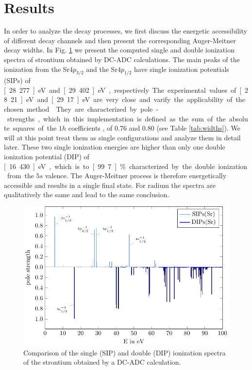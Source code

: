 \section{Results}
\label{section:results}

In order to analyze the decay processes, we first discuss the energetic
accessibility of different decay channels and then present the corresponding
Auger-Meitner decay widths.
In Fig. \ref{fig:sdip} we present the computed
single and double ionization spectra
of strontium obtained by DC-ADC calculations. The main peaks of the
ionization
from the Sr$4p_{3/2}$ and the Sr$4p_{1/2}$ have single ionization potentials (SIPs)
of \unit[28.277]{eV} and \unit[29.402]{eV}, respectively. The experimental
values of \unit[28.21]{eV} and \unit[29.17]{eV} are very close and
varify the applicability
of the chosen method \cite{Schmitz76}.
They are characterized by pole-strengths, which in this implementation
is defined as
the sum of the absolute squares of the $1h$ coefficients
\cite{Trofimov05}, of 0.76 and 0.80
(see Table \ref{tab:widths}). We will at this point treat them as single
configurations and analyze them in detail later.
These two single ionization energies are higher
than only one double ionization potential (DIP) of \unit[16.430]{eV},
which is to \unit[99.7]{\%} characterized by the double ionization from
the $5s$ valence. The Auger-Meitner process is therefore energetically accessible and
results in a single final state.
For radium the spectra are qualitatively the same and
lead to the same conclusion.

\begin{figure}[h]
 \centering
 \includegraphics[width=\columnwidth]{pics/Sr_rel_sdip.pdf}
 \caption{Comparison of the single (SIP) and double (DIP) ionization spectra
          of the strontium obtained by a DC-ADC calculation.}
 \label{fig:sdip}
\end{figure}

